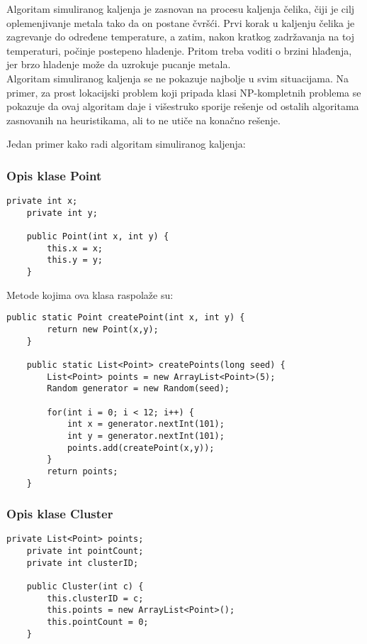 \documentclass[a4paper]{article}
\begin{document}
Algoritam simuliranog kaljenja je zasnovan na procesu kaljenja čelika, čiji je cilj oplemenjivanje metala tako da on postane čvršći. Prvi korak u kaljenju čelika je zagrevanje do određene temperature, a zatim, nakon kratkog zadržavanja na toj temperaturi, počinje postepeno hladenje. Pritom treba voditi o brzini hlađenja, jer brzo hladenje može da uzrokuje pucanje metala.\cite{miskovic}\\

Algoritam simuliranog kaljenja se ne pokazuje najbolje u svim situacijama. Na primer, za prost lokacijski problem koji pripada klasi NP-kompletnih problema se pokazuje da ovaj algoritam daje i višestruko sporije rešenje od ostalih algoritama zasnovanih na heuristikama, ali to ne utiče na konačno rešenje. \cite{paralelizacija}

Jedan primer kako radi algoritam simuliranog kaljenja:

\subsubsection*{Opis klase Point}

\begin{lstlisting}[title=Atributi i konstruktor]
	private int x; 
	private int y; 

	public Point(int x, int y) { 
		this.x = x; 
		this.y = y; 
	} 
\end{lstlisting}

Metode kojima ova klasa raspolaže su:

\begin{lstlisting}[title=Program 3: Klasa Point i njene metode]
	public static Point createPoint(int x, int y) { 
		return new Point(x,y); 
	} 

	public static List<Point> createPoints(long seed) { 
		List<Point> points = new ArrayList<Point>(5);
		Random generator = new Random(seed); 

		for(int i = 0; i < 12; i++) {
			int x = generator.nextInt(101);
			int y = generator.nextInt(101);
			points.add(createPoint(x,y));
		}
		return points; 
	} 
\end{lstlisting}


\subsubsection*{Opis klase Cluster}

\begin{lstlisting}[title=Atributi i konstruktor]
	private List<Point> points; 
	private int pointCount; 
	private int clusterID; 

	public Cluster(int c) { 
		this.clusterID = c; 
		this.points = new ArrayList<Point>();
		this.pointCount = 0; 
	} 

\end{lstlisting}
\end{document}
